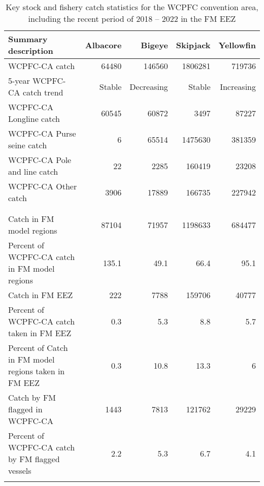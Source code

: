\begin{longtable}{lrrrr}
\caption{Key stock and fishery catch statistics for the WCPFC convention area, including the recent period of 2018 -- 2022 in the FM EEZ} \\ 
  \hline
Summary description & Albacore & Bigeye & Skipjack & Yellowfin \\ 
  \hline
WCPFC-CA catch & 64480 & 146560 & 1806281 & 719736 \\ 
  5-year WCPFC-CA catch trend & Stable & Decreasing & Stable & Increasing \\ 
  WCPFC-CA Longline catch & 60545 & 60872 & 3497 & 87227 \\ 
  WCPFC-CA Purse seine catch & 6 & 65514 & 1475630 & 381359 \\ 
  WCPFC-CA Pole and line catch & 22 & 2285 & 160419 & 23208 \\ 
  WCPFC-CA Other catch & 3906 & 17889 & 166735 & 227942 \\ 
   &  &  &  &  \\ 
   &  &  &  &  \\ 
   \hline
Catch in FM model regions & 87104 & 71957 & 1198633 & 684477 \\ 
  Percent of WCPFC-CA catch in FM model regions & 135.1 & 49.1 & 66.4 & 95.1 \\ 
  Catch in FM EEZ & 222 & 7788 & 159706 & 40777 \\ 
  Percent of WCPFC-CA catch taken in FM EEZ & 0.3 & 5.3 & 8.8 & 5.7 \\ 
  Percent of Catch in FM model regions taken in FM EEZ & 0.3 & 10.8 & 13.3 & 6 \\ 
  Catch by FM flagged in WCPFC-CA & 1443 & 7813 & 121762 & 29229 \\ 
  Percent of WCPFC-CA catch by FM flagged vessels & 2.2 & 5.3 & 6.7 & 4.1 \\ 
  \hline
\label{cat_sum_tab}
\end{longtable}
